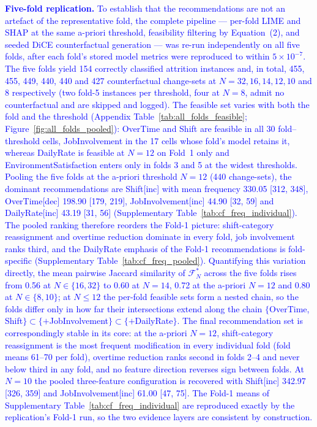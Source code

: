 \documentclass[a4paper,fleqn]{cas-sc}
\begin{document}
\textcolor{blue}{\textbf{Five-fold replication.} To establish that the recommendations are not an artefact of the representative fold, the complete pipeline --- per-fold LIME and SHAP at the same a-priori threshold, feasibility filtering by Equation~(2), and seeded DiCE counterfactual generation --- was re-run independently on all five folds, after each fold's stored model metrics were reproduced to within $5\times10^{-7}$. The five folds yield 154 correctly classified attrition instances and, in total, 455, 455, 449, 440, 440 and 427 counterfactual change-sets at $N = 32, 16, 14, 12, 10$ and $8$ respectively (two fold-5 instances per threshold, four at $N = 8$, admit no counterfactual and are skipped and logged). The feasible set varies with both the fold and the threshold (Appendix Table~\ref{tab:all_folds_feasible}; Figure~\ref{fig:all_folds_pooled}): OverTime and Shift are feasible in all 30 fold--threshold cells, JobInvolvement in the 17 cells whose fold's model retains it, whereas DailyRate is feasible at $N = 12$ on Fold~1 only and EnvironmentSatisfaction enters only in folds 3 and 5 at the widest thresholds. Pooling the five folds at the a-priori threshold $N = 12$ (440 change-sets), the dominant recommendations are Shift[inc] with mean frequency 330.05 [312, 348], OverTime[dec] 198.90 [179, 219], JobInvolvement[inc] 44.90 [32, 59] and DailyRate[inc] 43.19 [31, 56] (Supplementary Table~\ref{tab:cf_freq_individual}). The pooled ranking therefore reorders the Fold-1 picture: shift-category reassignment and overtime reduction dominate in every fold, job involvement ranks third, and the DailyRate emphasis of the Fold-1 recommendations is fold-specific (Supplementary Table~\ref{tab:cf_freq_pooled}). \textcolor{blue}{Quantifying this variation directly, the mean pairwise Jaccard similarity of $\mathcal{F}^*_N$ across the five folds rises from 0.56 at $N \in \{16, 32\}$ to 0.60 at $N = 14$, 0.72 at the a-priori $N = 12$ and 0.80 at $N \in \{8, 10\}$; at $N \le 12$ the per-fold feasible sets form a nested chain, so the folds differ only in how far their intersections extend along the chain $\{$OverTime, Shift$\} \subset \{+$JobInvolvement$\} \subset \{+$DailyRate$\}$. The final recommendation set is correspondingly stable in its core: at the a-priori $N = 12$, shift-category reassignment is the most frequent modification in every individual fold (fold means 61--70 per fold), overtime reduction ranks second in folds 2--4 and never below third in any fold, and no feature direction reverses sign between folds.} At $N = 10$ the pooled three-feature configuration is recovered with Shift[inc] 342.97 [326, 359] and JobInvolvement[inc] 61.00 [47, 75]. The Fold-1 means of Supplementary Table~\ref{tab:cf_freq_individual} are reproduced exactly by the replication's Fold-1 run, so the two evidence layers are consistent by construction.}
\end{document}
